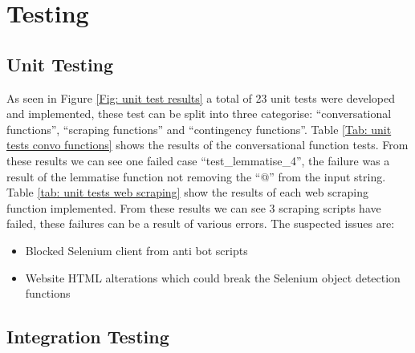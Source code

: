 \section{Testing}
\subsection{Unit Testing}
As seen in Figure \ref{Fig: unit test results} a total of 23 unit tests were developed and implemented, these test can be split into three categorise: ``conversational functions'', ``scraping functions'' and ``contingency functions''. Table \ref{Tab: unit tests convo functions} shows the results of the conversational function tests. From these results we can see one failed case ``test\_lemmatise\_4'', the failure was a result of the lemmatise function not removing the ``@'' from the input string. Table \ref{tab: unit tests web scraping} show the results of each web scraping function implemented. From these results we can see 3 scraping scripts have failed, these failures can be a result of various errors. The suspected issues are: 
\begin{itemize}
    \item Blocked Selenium client from anti bot scripts
    \item Website HTML alterations which could break the Selenium object detection functions
\end{itemize}


\subsection{Integration Testing}

